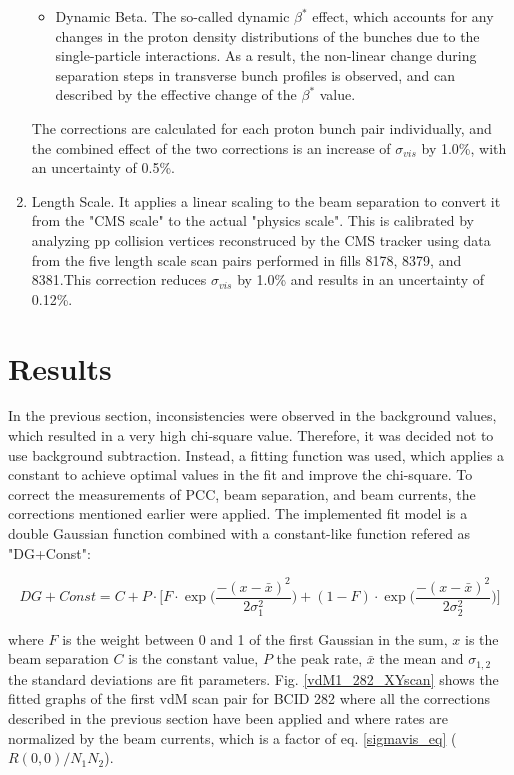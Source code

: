 \begin{enumerate}
\begin{itemize}
\item Dynamic Beta. The so-called dynamic $\beta^{*}$  effect, which accounts for any changes in the proton density distributions of the bunches due to the single-particle interactions. As a result, the non-linear change during separation steps in transverse bunch profiles is observed, and can described by the effective change of the $\beta^{*}$   value.
\end{itemize}
The corrections are calculated for each proton bunch pair individually, and the combined effect of the two corrections is an increase of $\sigma_{vis}$ by 1.0\%, with an uncertainty of 0.5\%.

\item Length Scale.  It applies a linear scaling to the beam separation to convert it from the "CMS scale" to the actual "physics scale". This is  calibrated by analyzing pp collision vertices reconstruced by the CMS tracker using data from the five length scale scan pairs performed in fills 8178, 8379, and 8381.This correction reduces $\sigma_{vis}$ by 1.0\% and results in an uncertainty of 0.12\%.


\end{enumerate}

\newpage
\section{Results}

In the previous section, inconsistencies were observed in the background values, which resulted in a very high chi-square value. Therefore, it was decided not to use background subtraction. Instead, a fitting function was used, which applies a constant to achieve optimal values in the fit and improve the chi-square. To correct the measurements of PCC, beam separation, and beam currents, the corrections mentioned earlier were applied. The implemented fit model is a double Gaussian function combined with a constant-like function refered as "DG+Const":

\begin{equation}
DG+Const=
 C+P \cdot \Biggl[ F \cdot \exp \Biggl( \frac{-(x-\bar{x})^{2}}{2 \sigma_{1}^{2} } \Biggr) + (1-F) \cdot \exp \Biggl( \frac{-(x-\bar{x})^{2}}{2 \sigma_{2}^{2} } \Biggr) \Biggr] 
\end{equation}

where $F$ is the weight between 0 and 1 of the first Gaussian in the sum, $x$ is the beam separation $C$ is the constant value, $P$ the peak rate, $\bar{x}$ the mean and $\sigma_{1,2}$ the standard deviations are fit parameters. Fig. \ref{vdM1_282_XYscan} shows the fitted graphs of the first vdM scan pair for BCID 282 where  all the corrections described in the previous section have been applied and where  rates are normalized by the beam currents, which is a factor of eq. \ref{sigmavis_eq}  ($R(0,0)/N_{1}N_{2}$).


